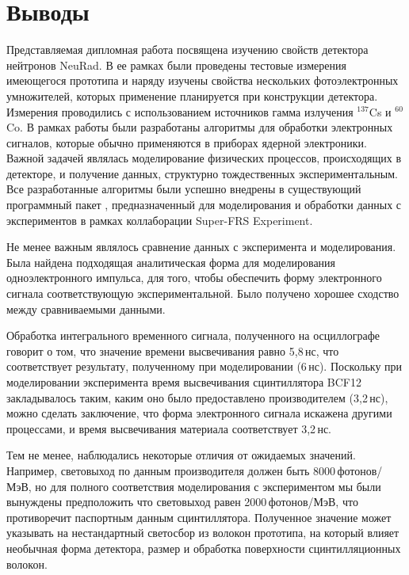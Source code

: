 \section{Выводы}

Представляемая дипломная работа посвящена изучению свойств детектора нейтронов NeuRad. В ее рамках были проведены тестовые измерения имеющегося прототипа и наряду изучены свойства нескольких фотоэлектронных умножителей, которых применение планируется при конструкции детектора.
%
Измерения проводились с использованием источников гамма излучения $^{137}$Cs и $^{60}$Co.
В рамках работы были разработаны алгоритмы для обработки электронных сигналов, которые обычно применяются в приборах ядерной электроники. 
Важной задачей являлась моделирование физических процессов, происходящих в детекторе, и получение данных, структурно тождественных экспериментальным.
%
Все разработанные алгоритмы были успешно внедрены в существующий программный пакет \er, предназначенный для моделирования и обработки данных с экспериментов в рамках коллаборации Super-FRS Experiment.

Не менее важным являлось сравнение данных с эксперимента и моделирования. 
Была найдена подходящая аналитическая форма для моделирования одноэлектронного импульса, для того, чтобы обеспечить форму электронного сигнала соответствующую экспериментальной. Было получено хорошее сходство между сравниваемыми данными.

Обработка интегрального временного сигнала, полученного на осциллографе говорит о том, что значение времени высвечивания равно 5,8\,нс, что соответствует результату, полученному при моделировании (6\,нс). Поскольку при моделировании эксперимента время высвечивания сцинтиллятора BCF12 закладывалось таким, каким оно было предоставлено производителем (3,2\,нс), можно сделать заключение, что форма электронного сигнала искажена другими процессами, и время высвечивания материала соответствует 3,2\,нс.

Тем не менее, наблюдались некоторые отличия от ожидаемых значений. Например, световыход по данным производителя должен быть 8000\,фотонов/МэВ, но для полного соответствия моделирования с экспериментом мы были вынуждены предположить что световыход равен 2000\,фотонов/МэВ, что противоречит паспортным данным сцинтиллятора. Полученное значение может указывать на нестандартный светосбор из волокон прототипа, на который влияет необычная форма детектора, размер и обработка поверхности сцинтилляционных волокон.

